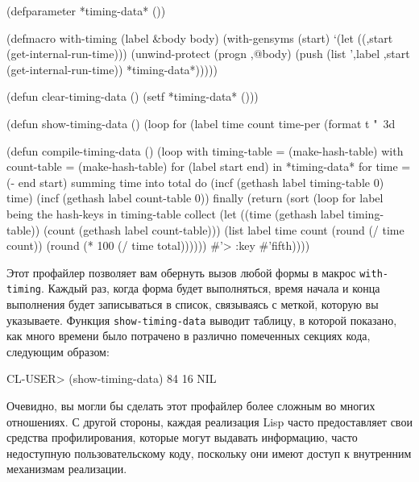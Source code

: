 \begin{myverb}
(defparameter *timing-data* ())

(defmacro with-timing (label &body body)
  (with-gensyms (start)
    `(let ((,start (get-internal-run-time)))
      (unwind-protect (progn ,@body)
        (push (list ',label ,start (get-internal-run-time)) *timing-data*)))))

(defun clear-timing-data ()
  (setf *timing-data* ()))

(defun show-timing-data ()
  (loop for (label time count time-per %
       (format t "~3d%

(defun compile-timing-data () 
  (loop with timing-table = (make-hash-table)
     with count-table = (make-hash-table)
     for (label start end) in *timing-data*
     for time = (- end start)
     summing time into total
     do
       (incf (gethash label timing-table 0) time)
       (incf (gethash label count-table 0))
     finally 
       (return
         (sort
          (loop for label being the hash-keys in timing-table collect
               (let  ((time (gethash label timing-table))
                      (count (gethash label count-table)))
                 (list label time count (round (/ time count)) (round (* 100 (/ time total))))))
          #'> :key #'fifth))))
\end{myverb}

Этот профайлер позволяет вам обернуть вызов любой формы в макрос
\lstinline{with-timing}. Каждый раз, когда форма будет выполняться, время начала и конца
выполнения будет записываться в список, связываясь с меткой, которую вы
указываете. Функция \lstinline{show-timing-data} выводит таблицу, в которой показано, как много
времени было потрачено в различно помеченных секциях кода, следующим образом:

\begin{myverb}
CL-USER> (show-timing-data)
 84%
 16%
NIL
\end{myverb}

Очевидно, вы могли бы сделать этот профайлер более сложным во многих отношениях. С другой
стороны, каждая реализация Lisp часто предоставляет свои средства профилирования, которые
могут выдавать информацию, часто недоступную пользовательскому коду, поскольку они имеют
доступ к внутренним механизмам реализации.

